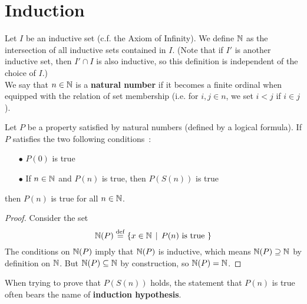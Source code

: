 \section{Induction}


\begin{definition} \label{natural-numbers}
    Let $I$ be an inductive set (c.f. the Axiom of Infinity). We define $\operatorname{\mathbb N}$ as the intersection of all inductive sets contained in $I$. (Note that if $I'$ is another inductive set, then $I' \cap I$ is also inductive, so this definition is independent of the choice of $I$.)
    \\

    We say that $n \in \operatorname{\mathbb N}$ is a \textbf{natural number} if it becomes a finite ordinal when equipped with the relation of set membership (i.e. for $i,j \in n$, we set $i < j$ if $i \in j$).
\end{definition}

\begin{theorem} \label{weak-induction-on-natural-numbers}
    Let $P$ be a property satisfied by natural numbers (defined by a logical formula). If $P$ satisfies the two following conditions~:
    \\

    \begin{itemize}
        \item[$\bullet$] $P(0)$ is true
        \\

        \item[$\bullet$] If $n \in \operatorname{\mathbb N}$ and $P(n)$ is true, then $P(S(n))$ is true
        \\

    \end{itemize}
    then $P(n)$ is true for all $n \in \operatorname{\mathbb N}$.
\end{theorem}

\begin{proof}
    Consider the set
    \[
        \operatorname{\mathbb N}(P) \overset{\mathrm{def}}{=} \{ x \in \operatorname{\mathbb N} \, \mid \, P(n) \text{ is true } \}    
    \]
    The conditions on $\operatorname{\mathbb N}(P)$ imply that $\operatorname{\mathbb N}(P)$ is inductive, which means $\operatorname{\mathbb N}(P) \supseteq \operatorname{\mathbb N}$ by definition on $\operatorname{\mathbb N}$. But $\operatorname{\mathbb N}(P) \subseteq \operatorname{\mathbb N}$ by construction, so $\operatorname{\mathbb N}(P) = \operatorname{\mathbb N}$. 
\end{proof}

\begin{remark}
    When trying to prove that $P(S(n))$ holds, the statement that $P(n)$ is true often bears the name of \textbf{induction hypothesis}.
\end{remark}

